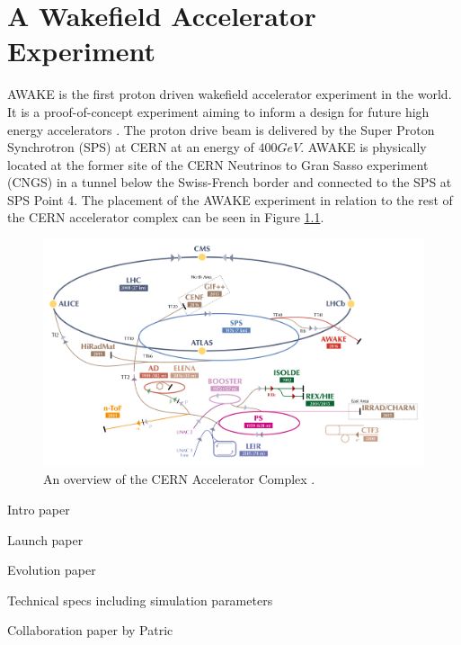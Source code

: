 %
%

\chapter{A Wakefield Accelerator Experiment}
\label{Ch:WFA}

AWAKE is the first proton driven wakefield accelerator experiment in the world. It is a proof-of-concept experiment aiming to inform a design for future high energy accelerators \cite{gschwendtner:2016}. The proton drive beam is delivered by the Super Proton Synchrotron (SPS) at CERN at an energy of $400\unit{GeV}$. AWAKE is physically located at the former site of the CERN Neutrinos to Gran Sasso experiment (CNGS) \cite{gschwendtner:2010} in a tunnel below the Swiss-French border and connected to the SPS at SPS Point 4. The placement of the AWAKE experiment in relation to the rest of the CERN accelerator complex can be seen in Figure \ref{Fig:WFA:AccComp}.

\begin{figure}[hbt]
    \centering
    \includegraphics[width=0.99\linewidth,trim={20mm 0mm 20mm 0mm},clip]{figures/AcceleratorComplex}
    \caption{\label{Fig:WFA:AccComp} An overview of the CERN Accelerator Complex \cite{add:mobs:2016}.}
\end{figure}



Intro paper \cite{caldwell:2009}

Launch paper \cite{awake_collaboration:2014}

Evolution paper \cite{caldwell:2016}

Technical specs including simulation parameters \cite{gschwendtner:2016}

Collaboration paper by Patric \cite{muggli:2017a}

